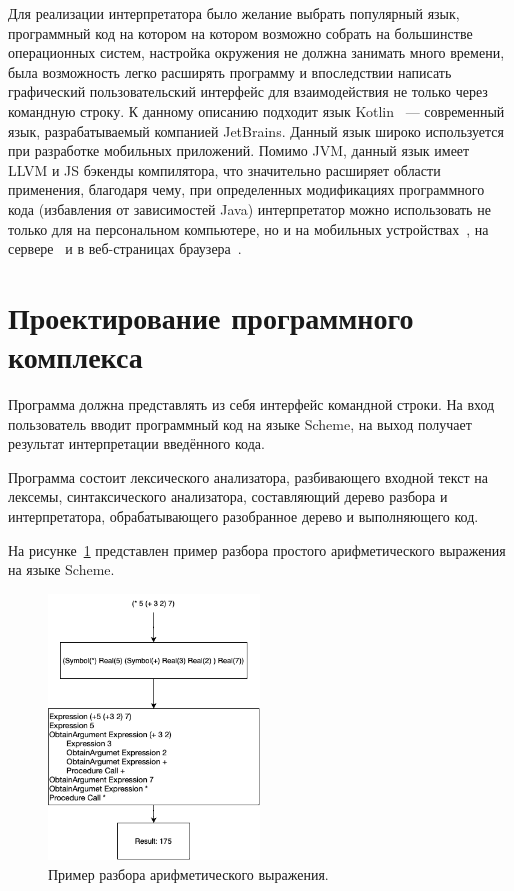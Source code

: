 \documentclass[14pt, russian]{scrartcl}
\begin{document}
Для реализации интерпретатора было желание выбрать популярный язык, программный код на котором на котором возможно собрать на большинстве операционных систем, настройка окружения не должна занимать много времени, была возможность легко расширять программу и впоследствии написать графический пользовательский интерфейс для взаимодействия не только через командную строку. К данному описанию подходит язык Kotlin~\cite{Kotlindocs} --- современный язык, разрабатываемый компанией JetBrains. Данный язык широко используется при разработке мобильных приложений. Помимо JVM, данный язык имеет LLVM и JS бэкенды компилятора, что значительно расширяет области применения, благодаря чему, при определенных модификациях программного кода (избавления от зависимостей Java) интерпретатор можно использовать не только для на персональном компьютере, но и на мобильных устройствах~\cite{Kmm}, на сервере~\cite{Kserv} и в веб-страницах браузера~\cite{Kjs}.


\section{Проектирование программного комплекса}

Программа должна представлять из себя интерфейс командной строки. На вход пользователь вводит программный код на языке Scheme, на выход получает результат интерпретации введённого кода.

Программа состоит лексического анализатора, разбивающего входной текст на лексемы, синтаксического анализатора, составляющий дерево разбора и интерпретатора, обрабатывающего разобранное дерево и выполняющего код.

На рисунке~\ref{fig::parse} представлен пример разбора простого арифметического выражения на языке Scheme.


\begin{figure}[!htb]\centering
\includegraphics[width=0.5\textwidth]{parse.png}
\caption{Пример разбора арифметического выражения.}
\label{fig::parse}
\end{figure}
\end{document}
